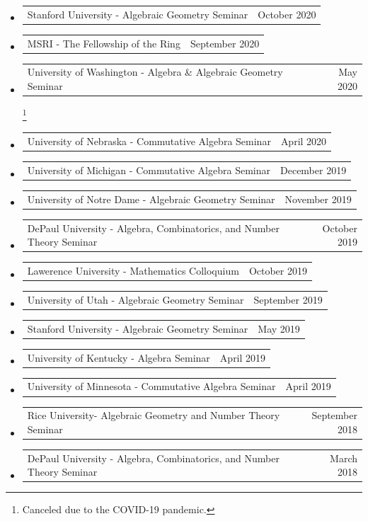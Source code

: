\documentclass[letterpaper,11pt]{article}
\makeatletter
\newcommand{\ressubheading}[4]{
\begin{tabular*}{6.5in}[t]{l@{\cftdotfill{\cftsecdotsep}\extracolsep{\fill}}r}
		\textbf{#1} & #2 \\
		\textit{#3} & \textit{#4} \\
\end{tabular*}\vspace{-6pt}}
\newcommand{\ressubheadingTalk}[2]{
\begin{tabular*}{6.5in}[t]{l@{\cftdotfill{\cftsecdotsep}\extracolsep{\fill}}r}
		#1 & #2 \\
\end{tabular*}\vspace{-6pt}}
\makeatother
\begin{document}
\begin{itemize}
\item
	\ressubheadingTalk{Stanford University - Algebraic Geometry Seminar}{October 2020}
	
\item
	\ressubheadingTalk{MSRI - The Fellowship of the Ring}{September 2020}
	
\item 
	\ressubheadingTalk{University of Washington - Algebra \& Algebraic Geometry Seminar}{May 2020}\footnote[2]{Canceled due to the COVID-19 pandemic.} 


\item 
	\ressubheadingTalk{University of Nebraska - Commutative Algebra Seminar}{April 2020}\footnotemark[2]

\item 
	\ressubheadingTalk{University of Michigan - Commutative Algebra Seminar}{December 2019}

\item
	\ressubheadingTalk{University of Notre Dame - Algebraic Geometry Seminar}{November 2019}

\item
	\ressubheadingTalk{DePaul University - Algebra, Combinatorics, and Number Theory Seminar}{October 2019}{}{}
	
\item
	\ressubheadingTalk{Lawerence University - Mathematics Colloquium}{October 2019}{}{}

\item
	\ressubheadingTalk{University of Utah - Algebraic Geometry Seminar}{September 2019}

\item
	\ressubheadingTalk{Stanford University - Algebraic Geometry Seminar}{May 2019}
	
\item
	\ressubheadingTalk{University of Kentucky - Algebra Seminar}{April 2019}
		
\item
	\ressubheadingTalk{University of Minnesota - Commutative Algebra Seminar}{April 2019}
	
	
\item
	\ressubheadingTalk{Rice University- Algebraic Geometry and Number Theory Seminar}{September 2018}{}{}
		
\item
	\ressubheadingTalk{DePaul University - Algebra, Combinatorics, and Number Theory Seminar}{March 2018}{}{}
	

\end{itemize}
\end{document}

